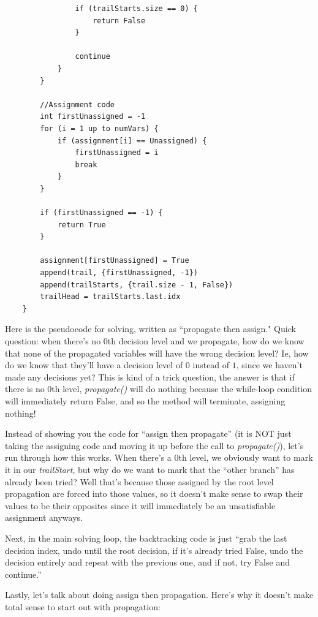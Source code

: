 \documentclass[oneside]{book}
\begin{document}
\begin{lstlisting}
                if (trailStarts.size == 0) {
                    return False
                }

                continue
            }
        }

        //Assignment code
        int firstUnassigned = -1
        for (i = 1 up to numVars) {
            if (assignment[i] == Unassigned) {
                firstUnassigned = i
                break
            }
        }

        if (firstUnassigned == -1) {
            return True
        }

        assignment[firstUnassigned] = True
        append(trail, {firstUnassigned, -1})
        append(trailStarts, {trail.size - 1, False})
        trailHead = trailStarts.last.idx
    }
\end{lstlisting}

Here is the pseudocode for solving, written as ``propagate then assign." Quick question:
when there's no 0th decision level and we propagate, how do we know that none of the 
propagated variables will have the wrong decision level? Ie, how do we know that they'll 
have a decision level of $0$ instead of $1$, since we haven't made any decisions yet?
This is kind of a trick question, the answer is that if there is no 0th level,
\textit{propagate()} will do nothing because the while-loop condition will immediately 
return False, and so the method will terminate, assigning nothing! 

Instead of showing you the code for ``assign then propagate'' (it is NOT just taking 
the assigning code and moving it up before the call to \textit{propagate()}), let's 
run through how this works. When there's a 0th level, we obviously want to mark it 
in our \textit{trailStart}, but why do we want to mark that the ``other branch'' has 
already been tried? Well that's because those assigned by the root level propagation 
are forced into those values, so it doesn't make sense to swap their values to be 
their opposites since it will immediately be an unsatisfiable assignment anyways. 

Next, in the main solving loop, the backtracking code is just ``grab the last 
decision index, undo until the root decision, if it's already tried False, undo 
the decision entirely and repeat with the previous one, and if not, try False 
and continue.''

Lastly, let's talk about doing assign then propagation. Here's why it doesn't
make total sense to start out with propagation:
\end{document}
